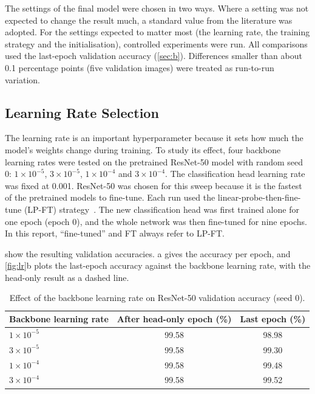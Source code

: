 \documentclass[11pt,a4paper]{article}
\begin{document}
The settings of the final model were chosen in two ways. Where a setting was not expected to change the result much, a standard value from the literature was adopted. For the settings expected to matter most (the learning rate, the training strategy and the initialisation), controlled experiments were run. All comparisons used the last-epoch validation accuracy (\cref{sec:b}). Differences smaller than about 0.1 percentage points (five validation images) were treated as run-to-run variation.

\subsection*{Learning Rate Selection}

The learning rate is an important hyperparameter because it sets how much the model's weights change during training. To study its effect, four backbone learning rates were tested on the pretrained ResNet-50 model with random seed 0: $1 \times 10^{-5}$, $3 \times 10^{-5}$, $1 \times 10^{-4}$ and $3 \times 10^{-4}$. The classification head learning rate was fixed at 0.001. ResNet-50 was chosen for this sweep because it is the fastest of the pretrained models to fine-tune. Each run used the linear-probe-then-fine-tune (LP-FT) strategy~\cite{kumar2022lpft}. The new classification head was first trained alone for one epoch (epoch 0), and the whole network was then fine-tuned for nine epochs. In this report, ``fine-tuned'' and FT always refer to LP-FT.

 show the resulting validation accuracies. a gives the accuracy per epoch, and \cref{fig:lr}b plots the last-epoch accuracy against the backbone learning rate, with the head-only result as a dashed line.

\begin{table}[ht]
  \centering
  \small
  \caption{Effect of the backbone learning rate on ResNet-50 validation accuracy (seed 0).}
  \label{tab:lr}
  \begin{tabular}{@{}lcc@{}}
    \toprule
    Backbone learning rate & After head-only epoch (\%) & Last epoch (\%) \\
    \midrule
    $1 \times 10^{-5}$ & 99.58 & 98.98 \\
    $3 \times 10^{-5}$ & 99.58 & 99.30 \\
    $1 \times 10^{-4}$ & 99.58 & 99.48 \\
    $3 \times 10^{-4}$ & 99.58 & 99.52 \\
    \bottomrule
  \end{tabular}
\end{table}
\end{document}
